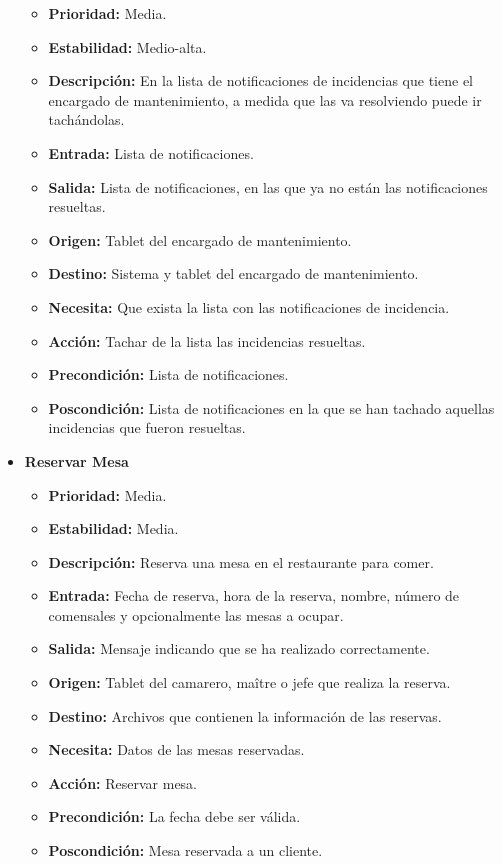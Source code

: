 \documentclass[spanish,a4paper,11pt, twoside]{report}	%
\begin{document}
\begin{itemize}
\begin{itemize}
			\item \textbf{Prioridad: }Media.
			\item \textbf{Estabilidad: }Medio-alta.
			\item \textbf{Descripción: }En la lista de notificaciones de incidencias que tiene el encargado de mantenimiento, a medida que las va resolviendo puede ir tachándolas.
			\item \textbf{Entrada: }Lista de notificaciones.
			\item \textbf{Salida: }Lista de notificaciones, en las que ya no están las notificaciones resueltas.
			\item \textbf{Origen: }Tablet del encargado de mantenimiento.
			\item \textbf{Destino: }Sistema y tablet del encargado de mantenimiento.
			\item \textbf{Necesita: }Que exista la lista con las notificaciones de incidencia.
			\item \textbf{Acción: }Tachar de la lista las incidencias resueltas.
			\item \textbf{Precondición: }Lista de notificaciones.
			\item \textbf{Poscondición: }Lista de notificaciones en la que se han tachado aquellas incidencias que fueron resueltas.

		\end{itemize}%

\item \textbf{Reservar Mesa} %

		\begin{itemize}
			\item \textbf{Prioridad: } Media.
			\item \textbf{Estabilidad: } Media.
			\item \textbf{Descripción: } Reserva una mesa en el restaurante para comer.
			\item \textbf{Entrada: } Fecha de reserva, hora de la reserva, nombre, número de comensales y opcionalmente las mesas a ocupar.
			\item \textbf{Salida: } Mensaje indicando que se ha realizado correctamente.
			\item \textbf{Origen: } Tablet del camarero, maître o jefe que realiza la reserva.
			\item \textbf{Destino: } Archivos que contienen la información de las reservas.
			\item \textbf{Necesita: } Datos de las mesas reservadas.
			\item \textbf{Acción: } Reservar mesa.
			\item \textbf{Precondición: } La fecha debe ser válida.
			\item \textbf{Poscondición: } Mesa reservada a un cliente.


\end{itemize}
\end{itemize}
\end{document}

